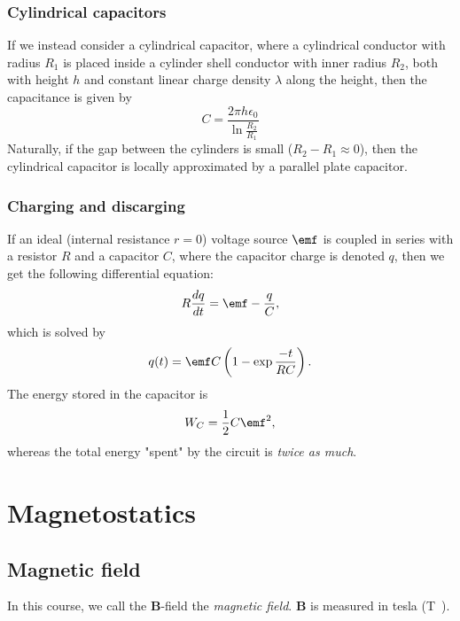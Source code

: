 \documentclass[a4paper, 12pt]{article}
\renewcommand{\vec}[1]{\bm{#1}}
\newcommand{\e}{\ensuremath{\epsilon_0}}
\newcommand{\B}{\ensuremath{\vec{B}}}
\begin{document}
    \subsubsection{Cylindrical capacitors}
        If we instead consider a cylindrical capacitor, 
        where a cylindrical conductor with radius $R_1$ is placed inside a cylinder shell conductor with inner radius $R_2$, 
        both with height $h$ and constant linear charge density $\lambda$ along the height, then the capacitance is given by 
        \begin{equation}
            C = \frac{2\pi h \e}{\ln{\frac{R_2}{R_1}}}
        \end{equation}
        Naturally, if the gap between the cylinders is small ($R_2 - R_1 \approx 0$), 
        then the cylindrical capacitor is locally approximated by a parallel plate capacitor.

    \subsubsection{Charging and discarging}
        If an ideal (internal resistance $r=0$) voltage source $\emf$ is coupled in series with a resistor $R$ 
        and a capacitor $C$, where the capacitor charge is denoted $q$, then we get the following differential equation: 
        \begin{equation}
            R\frac{dq}{dt} = \emf - \frac{q}{C},
        \end{equation}
        which is solved by
        \begin{equation}
            q(t) = \emf C \left(1-\exp{\frac{-t}{RC}}\right).
        \end{equation}
        The energy stored in the capacitor is 
        \begin{equation}
            W_C = \frac{1}{2}C\emf^2,
        \end{equation}
        whereas the total energy "spent" by the circuit is \textit{twice as much}.

\section{Magnetostatics}
    \subsection{Magnetic field}
        In this course, we call the \B-field the \textit{magnetic field}. \B{} is measured in tesla (\si\tesla).
        
\end{document}
